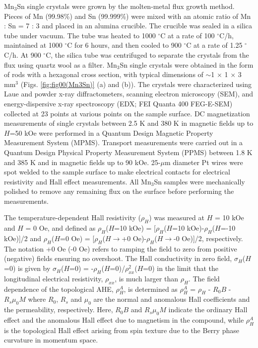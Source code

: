 \documentclass[prb,twocolumn,showpacs,preprintnumbers,amsmath,amssymb]{revtex4}
\begin{document}
Mn$_3$Sn single crystals were grown by the molten-metal flux growth method.\cite{Fisk1992}
Pieces of Mn (99.98\%) and Sn (99.999\%) were mixed with an atomic ratio of Mn : Sn = 7 : 3 and placed in an alumina crucible. 
The crucible was sealed in a silica tube under vacuum. 
The tube was heated  to 1000 $^\circ$C at a rate of 100 $^\circ$C/h,
maintained at 1000 $^\circ$C for 6 hours, and then cooled to 900 $^\circ$C at a rate of 1.25 $^\circ$C/h. 
At 900 $^\circ$C,  the silica tube was centrifuged to separate the  crystals from the flux using quartz wool as a filter. Mn$_3$Sn single crystals were obtained in the form of rods with a hexagonal cross section, with typical dimensions of $\sim$1 $\times$ 1 $\times$ 3 mm$^3$ (Figs. \ref{fig:fig00(Mn3Sn)} (a) and (b)).  
The crystals were characterized using Laue and powder x-ray diffractometers, scanning electron microscopy (SEM), and energy-dispersive x-ray spectroscopy (EDX; FEI Quanta 400 FEG-E-SEM) collected at 23 points at various points on the sample surface.
DC magnetization measurements of single crystals between 2.5 K and 380 K in magnetic fields up to $H$=50 kOe were performed in a Quantum Design Magnetic Property Measurement System (MPMS).  
Transport measurements were carried out in a Quantum Design Physical Property Measurement System (PPMS) between 1.8 K and 385 K and in magnetic fields up to 90 kOe. 
25-$\mu$m diameter Pt wires were spot welded to the sample surface  to make electrical contacts for electrical resistivity and Hall effect measurements. 
All Mn$_3$Sn samples were mechanically polished to remove any remaining flux on the surface before performing the measurements.

The temperature-dependent Hall resistivity ($\rho_{H}$) was measured at $H$ = 10 kOe and $H$ = 0 Oe, and defined as $\rho_{H}$($H$=10 kOe) = [$\rho_{H}$($H$=10 kOe)-$\rho_{H}$($H$=-10 kOe)]/2 and $\rho_{H}$($H$=0 Oe) = [$\rho_{H}$($H$$\rightarrow$+0 Oe)-$\rho_{H}$($H$$\rightarrow$-0 Oe)]/2, respectively. 
The notation +0 Oe (-0 Oe) refers to ramping the field to zero from positive (negative) fields ensuring no overshoot.
The Hall conductivity in zero field, $\sigma_H$($H$=0) is given by $\sigma_H$($H$=0) = -$\rho_{H}$($H$=0)/$\rho_{xx}^2$($H$=0) in the limit that the longitudinal electrical resistivity, $\rho_{xx}$, is much larger than $\rho_{H}$.
The field dependence of the topological AHE, $\rho^{A}_{H}$, is determined as $\rho^{A}_{H}$ = $\rho_{H}$ - $R_{0}B$ - $R_{s}\mu_{0}M$ where $R_0$, $R_s$ and $\mu_0$ are the normal and anomalous Hall coefficients and the permeability, respectively.
Here, $R_0$$B$ and $R_{s}\mu_{0}M$ indicate the ordinary Hall effect and the anomalous Hall effect due to magnetism in the compound, while $\rho^{A}_{H}$ is the topological Hall effect arising from spin texture due to the Berry phase curvature in momentum space.
\end{document}
